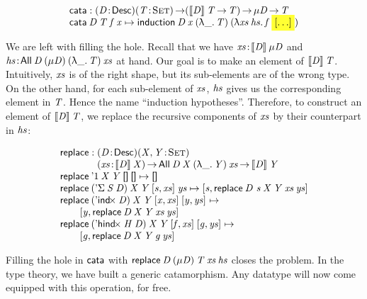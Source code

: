 \newcommand{\cata}{\F{cata}}

\[\stk{
\cata : \PITEL{\V{D}}{\Desc}
           \PI{\V{T}}{\Set}
           (\descop{\V{D}}{\V{T}} \To \V{T}) \To 
           \Mu{\V{D}} \To \V{T} \\
\cata\: \V{D}\: \V{T}\: \V{f\: \V{x}} \mapsto
  \F{induction}\: \V{D}\:\V{x}\: (\LAM{\_}\V{T})\: (\LAM{\V{xs}\:\V{hs}} \V{f}\: \SHED)
}\]

We are left with filling the hole. Recall that we have
\(\Bhab{\V{xs}}{\descop{\V{D}}{\Mu{\V{D}}}}\) and
\(\Bhab{\V{hs}}{\All{\V{D}}{(\Mu{\V{D}})}{(\LAM{\_} \V{T})}{\V{xs}}}\)
at hand. Our goal is to make an element of
\(\descop{\V{D}}{\V{T}}\). Intuitively, $\V{xs}$ is of the right
shape, but its sub-elements are of the wrong type. On the other hand,
for each sub-element of $\V{xs}$, $\V{hs}$ gives us the corresponding
element in $\V{T}$. Hence the name ``induction
hypotheses''. Therefore, to construct an element of
\(\descop{\V{D}}{\V{T}}\), we replace the recursive components of
\(\V{xs}\) by their counterpart in \(\V{hs}\):

\[\stk{
\F{replace} : \stk{\PITEL{\V{D}}{\Desc}
                   \PITEL{\V{X},\V{Y}}{\Set}\\
                   \PI{\V{xs}}{\descop{\V{D}}{\V{X}}} 
                   \All{\V{D}}{\V{X}}{(\LAM{\_}\V{Y})}{\V{xs}} \To
                   \descop{\V{D}}{\V{Y}}} \\
\F{replace}\: \DUnit\:          \V{X}\: \V{Y}\: \Void\:          \Void          \mapsto 
    \Void                                                                                                         \\
\F{replace}\: (\DSigma{\V{S}}{\V{D}})\: \V{X}\: \V{Y}\: \pair{\V{s}}{\V{xs}}{}\: \V{ys}             \mapsto
    \pair{\V{s}}{\F{replace}\: {\V{D}~\V{s}}\: \V{X}\: \V{Y}\: \V{xs}\: \V{ys}}{}                                 \\
\F{replace}\: (\DIndx{\V{D}})\:     \V{X}\: \V{Y}\: \pair{\V{x}}{\V{xs}}{}\: \pair{\V{y}}{\V{ys}}{} \mapsto       \\
\qquad  \pair{\V{y}}{\F{replace}\: \V{D}\: \V{X}\: \V{Y}\: \V{xs}\: \V{ys}}{}                                     \\
\F{replace}\: (\DHindx{\V{H}}{\V{D}})\: \V{X}\: \V{Y}\: \pair{\V{f}}{\V{xs}}{}\: \pair{\V{g}}{\V{ys}}{} \mapsto   \\
\qquad  \pair{\V{g}}{\F{replace}\: \V{D}\: \V{X}\: \V{Y}\: \V{g}\: \V{ys}}{}
}\]

Filling the hole in $\F{cata}$ with \(\F{replace}\: \V{D}\: (\Mu{\V{D}})\: \V{T}\: \V{xs}\: \V{hs}\) closes the
problem. In the type theory, we have built a generic catamorphism. Any
datatype will now come equipped with this operation, for free.

